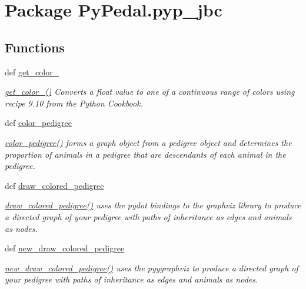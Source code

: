 \hypertarget{namespacePyPedal_1_1pyp__jbc}{
\section{Package Py\-Pedal.pyp\_\-jbc}
\label{namespacePyPedal_1_1pyp__jbc}
}


\subsection*{Functions}
\begin{CompactItemize}
\item 
def \hyperlink{namespacePyPedal_1_1pyp__jbc_684ddf07aa8b4275b4de4025306bb8ac}{get\_\-color\_}
\begin{CompactList}\small\item\em \hyperlink{namespacePyPedal_1_1pyp__jbc_684ddf07aa8b4275b4de4025306bb8ac}{get\_\-color\_()} Converts a float value to one of a continuous range of colors using recipe 9.10 from the Python Cookbook. \item\end{CompactList}\item 
def \hyperlink{namespacePyPedal_1_1pyp__jbc_dbc1c88a0fcf403645e7310f6b6da99f}{color\_\-pedigree}
\begin{CompactList}\small\item\em \hyperlink{namespacePyPedal_1_1pyp__jbc_dbc1c88a0fcf403645e7310f6b6da99f}{color\_\-pedigree()} forms a graph object from a pedigree object and determines the proportion of animals in a pedigree that are descendants of each animal in the pedigree. \item\end{CompactList}\item 
def \hyperlink{namespacePyPedal_1_1pyp__jbc_dd01c0570f87aaac52c6cc89e39dacdb}{draw\_\-colored\_\-pedigree}
\begin{CompactList}\small\item\em \hyperlink{namespacePyPedal_1_1pyp__jbc_dd01c0570f87aaac52c6cc89e39dacdb}{draw\_\-colored\_\-pedigree()} uses the pydot bindings to the graphviz library to produce a directed graph of your pedigree with paths of inheritance as edges and animals as nodes. \item\end{CompactList}\item 
def \hyperlink{namespacePyPedal_1_1pyp__jbc_3b775faed2b4c51293a105869000d32e}{new\_\-draw\_\-colored\_\-pedigree}
\begin{CompactList}\small\item\em \hyperlink{namespacePyPedal_1_1pyp__jbc_3b775faed2b4c51293a105869000d32e}{new\_\-draw\_\-colored\_\-pedigree()} uses the pyygraphviz to produce a directed graph of your pedigree with paths of inheritance as edges and animals as nodes. \item\end{CompactList}\end{CompactItemize}


